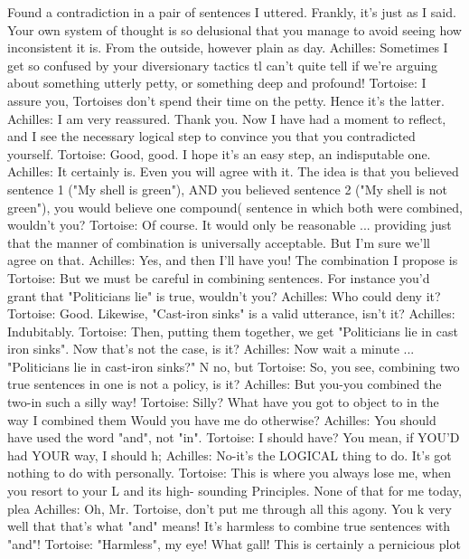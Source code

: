 Found a contradiction in a pair of sentences I uttered. Frankly, it’s just as I said. Your
       own system of thought is so delusional that you manage to avoid seeing how
       inconsistent it is. From the outside, however plain as day.
Achilles: Sometimes I get so confused by your diversionary tactics tl can't quite tell if
       we're arguing about something utterly petty, or something deep and profound!
Tortoise: I assure you, Tortoises don't spend their time on the petty. Hence it's the latter.
Achilles: I am very reassured. Thank you. Now I have had a moment to reflect, and I see
       the necessary logical step to convince you that you contradicted yourself.
Tortoise: Good, good. I hope it's an easy step, an indisputable one.
Achilles: It certainly is. Even you will agree with it. The idea is that you believed
       sentence 1 ("My shell is green"), AND you believed sentence 2 ("My shell is not
       green"), you would believe one compound( sentence in which both were
       combined, wouldn't you?
Tortoise: Of course. It would only be reasonable ... providing just that the manner of
       combination is universally acceptable. But I'm sure we'll agree on that.
Achilles: Yes, and then I'll have you! The combination I propose is
Tortoise: But we must be careful in combining sentences. For instance you'd grant that
       "Politicians lie" is true, wouldn't you?
Achilles: Who could deny it?
Tortoise: Good. Likewise, "Cast-iron sinks" is a valid utterance, isn't it?
Achilles: Indubitably.
Tortoise: Then, putting them together, we get "Politicians lie in cast iron sinks". Now
       that's not the case, is it?
Achilles: Now wait a minute ... "Politicians lie in cast-iron sinks?" N no, but
Tortoise: So, you see, combining two true sentences in one is not a policy, is it?
Achilles: But you-you combined the two-in such a silly way!
Tortoise: Silly? What have you got to object to in the way I combined them Would you
       have me do otherwise?
Achilles: You should have used the word "and", not "in".
Tortoise: I should have? You mean, if YOU'D had YOUR way, I should h;
Achilles: No-it's the LOGICAL thing to do. It's got nothing to do with personally.
Tortoise: This is where you always lose me, when you resort to your L and its high-
       sounding Principles. None of that for me today, plea
Achilles: Oh, Mr. Tortoise, don't put me through all this agony. You k very well that
       that's what "and" means! It's harmless to combine true sentences with "and"!
Tortoise: "Harmless", my eye! What gall! This is certainly a pernicious plot

